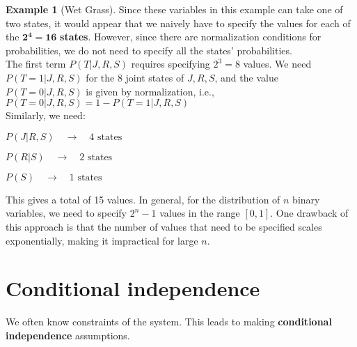 \documentclass[12pt, a4paper]{article}
\theoremstyle{definition}
\newtheorem{example}{Example}[section]
\numberwithin{figure}{section}
\numberwithin{equation}{section}
\numberwithin{table}{section}
\begin{document}
\begin{example}[Wet Grass]
Since these variables in this example can take one of two states, it would appear that we naively have to specify the values for each of the $\boldsymbol{2^4 = 16}$ \textbf{states}. However, since there are normalization conditions for probabilities, we do not need to specify all the states' probabilities.\\

The first term $P(T | J, R, S)$ requires specifying $2^3 = 8$ values. We need $P(T = 1 | J, R, S)$ for the 8 joint states of $J, R, S$, and the value $P(T = 0 | J, R, S)$ is given by normalization, i.e., $P(T = 0 | J, R, S) = 1 - P(T = 1 | J, R, S)$\\

Similarly, we need:  

$P(J | R, S) \quad \rightarrow \quad 4 \text{ states}$

$P(R | S) \quad \rightarrow \quad 2 \text{ states}$

$P(S) \quad \rightarrow \quad 1 \text{ states}$

This gives a total of 15 values.
In general, for the distribution of $n$ binary variables, we need to specify $2^n - 1$ values in the range $[0,1]$.  
One drawback of this approach is that the number of values that need to be specified scales exponentially, making it impractical for large $n$.  

\end{example}

\section{Conditional independence}
We often know constraints of the system. This leads to making \textbf{conditional independence} assumptions.
\end{document}
